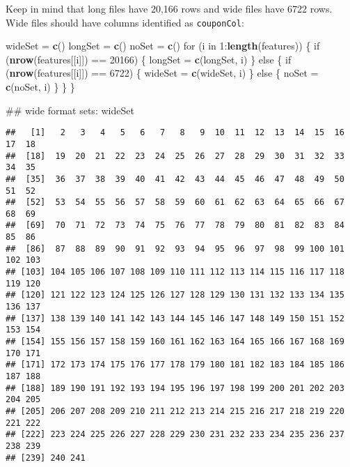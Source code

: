 \documentclass[10pt]{report}
\newenvironment{Shaded}{}{}
\newcommand{\KeywordTok}[1]{\textcolor[rgb]{0.00,0.44,0.13}{\textbf{{#1}}}}
\newcommand{\DecValTok}[1]{\textcolor[rgb]{0.25,0.63,0.44}{{#1}}}
\newcommand{\StringTok}[1]{\textcolor[rgb]{0.25,0.44,0.63}{{#1}}}
\newcommand{\NormalTok}[1]{{#1}}
\begin{document}
Keep in mind that long files have 20,166 rows and wide files have 6722
rows. Wide files should have columns identified as \verb!couponCol!:

\begin{Shaded}
\begin{Highlighting}[]
\NormalTok{wideSet =}\StringTok{ }\KeywordTok{c}\NormalTok{()}
\NormalTok{longSet =}\StringTok{ }\KeywordTok{c}\NormalTok{()}
\NormalTok{noSet =}\StringTok{ }\KeywordTok{c}\NormalTok{()}
\NormalTok{for (i in }\DecValTok{1}\NormalTok{:}\KeywordTok{length}\NormalTok{(features)) \{}
    \NormalTok{if (}\KeywordTok{nrow}\NormalTok{(features[[i]]) ==}\StringTok{ }\DecValTok{20166}\NormalTok{) \{}
        \NormalTok{longSet =}\StringTok{ }\KeywordTok{c}\NormalTok{(longSet, i)}
    \NormalTok{\} else \{}
        \NormalTok{if (}\KeywordTok{nrow}\NormalTok{(features[[i]]) ==}\StringTok{ }\DecValTok{6722}\NormalTok{) \{}
            \NormalTok{wideSet =}\StringTok{ }\KeywordTok{c}\NormalTok{(wideSet, i)}
        \NormalTok{\} else \{}
            \NormalTok{noSet =}\StringTok{ }\KeywordTok{c}\NormalTok{(noSet, i)}
        \NormalTok{\}}
    \NormalTok{\}}
\NormalTok{\}}

\NormalTok{## wide format sets:}
\NormalTok{wideSet}
\end{Highlighting}
\end{Shaded}

\begin{verbatim}
##   [1]   2   3   4   5   6   7   8   9  10  11  12  13  14  15  16  17  18
##  [18]  19  20  21  22  23  24  25  26  27  28  29  30  31  32  33  34  35
##  [35]  36  37  38  39  40  41  42  43  44  45  46  47  48  49  50  51  52
##  [52]  53  54  55  56  57  58  59  60  61  62  63  64  65  66  67  68  69
##  [69]  70  71  72  73  74  75  76  77  78  79  80  81  82  83  84  85  86
##  [86]  87  88  89  90  91  92  93  94  95  96  97  98  99 100 101 102 103
## [103] 104 105 106 107 108 109 110 111 112 113 114 115 116 117 118 119 120
## [120] 121 122 123 124 125 126 127 128 129 130 131 132 133 134 135 136 137
## [137] 138 139 140 141 142 143 144 145 146 147 148 149 150 151 152 153 154
## [154] 155 156 157 158 159 160 161 162 163 164 165 166 167 168 169 170 171
## [171] 172 173 174 175 176 177 178 179 180 181 182 183 184 185 186 187 188
## [188] 189 190 191 192 193 194 195 196 197 198 199 200 201 202 203 204 205
## [205] 206 207 208 209 210 211 212 213 214 215 216 217 218 219 220 221 222
## [222] 223 224 225 226 227 228 229 230 231 232 233 234 235 236 237 238 239
## [239] 240 241
\end{verbatim}
\end{document}
